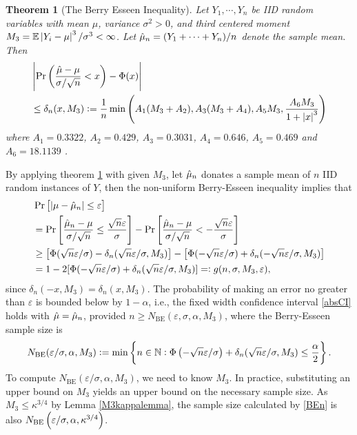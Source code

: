\documentclass{iitthesis}
\newtheorem{theorem}{Theorem}[section]
\theoremstyle{definition}
\begin{document}
\begin{theorem}[The Berry Esseen Inequality] \label{BEThm}
Let $Y_1,\cdots,Y_n$ be IID random variables with mean $\mu$, variance $\sigma^2 >0$, and third centered moment $M_3 = \mathbb{E}\left \lvert Y_i-\mu \right \rvert^3/\sigma^3 < \infty$. Let $\hat{\mu}_n = (Y_1+\cdots+Y_n)/n$ denote the sample mean. Then
\begin{align}
&\left \lvert \Pr\left(\frac{\hat{\mu}-\mu}{\sigma/\sqrt{n}}<x\right)-\Phi(x) \right \rvert\\
& \leq \delta_n(x,M_3):=\frac{1}{n}\min\left( A_1(M_3+A_2),  A_3(M_3+A_4), A_5M_3, \frac{A_6M_3}{1+\left \lvert x \right \rvert^3}\right) \label{deltaBEconstant}
\end{align}
where $A_1 = 0.3322$, $A_2 = 0.429$, $A_3=0.3031$, $A_4=0.646$, $A_5=0.469$ \cite{She13} and $A_6=18.1139$ \cite{NeShe12}.
\end{theorem}
By applying theorem \ref{BEThm} with given $M_3$, let $\hat{\mu}_n$ donates a sample mean of $n$ IID random instances of $Y$, then the non-uniform Berry-Esseen inequality implies that
\begin{align} 
&\Pr\left[\left \lvert \mu-\hat{\mu}_n \right \rvert  \le \varepsilon \right]\nonumber\\
&=\Pr\left[\frac{\hat{\mu}_n - \mu}{\sigma/\sqrt{n}} \le \frac{\sqrt{n}\varepsilon}{\sigma} \right]-\Pr\left[\frac{\hat{\mu}_n - \mu}{\sigma/\sqrt{n}} < -\frac{\sqrt{n}\varepsilon}{\sigma}\right] \nonumber \\ 
&\ge \left[\Phi(\sqrt{n}\varepsilon/\sigma)-\delta_n(\sqrt{n}\varepsilon/\sigma,M_3)\right] -\left[\Phi(-\sqrt{n}\varepsilon/\sigma) + \delta_n(-\sqrt{n}\varepsilon/\sigma,M_3)\right] \nonumber \\
&=1-2[\Phi(-\sqrt{n}\varepsilon/\sigma) + \delta_n(\sqrt{n}\varepsilon/\sigma,M_3)] =: g(n, \sigma, M_3, \varepsilon), \label{BEresult}
\end{align}
since $\delta_n(-x,M_3)=\delta_n(x,M_3)$.  The probability of
making an error no greater than $\varepsilon$ is bounded below by $1-\alpha$, i.e., the fixed width confidence interval \eqref{absCI} holds with $\hat{\mu}=\hat{\mu}_n$, provided $n \ge N_{\text{BE}}(\varepsilon,\sigma,\alpha,M_3)$, where the Berry-Esseen sample size is
\begin{equation}\label{BEn}
N_{\text{BE}}(\varepsilon/\sigma,\alpha,M_3) := \min  \left \{ n \in \mathbb{N} : \Phi\left(-\sqrt{n}\varepsilon/\sigma  \right)+\delta_n(\sqrt{n}\varepsilon/\sigma,M_3)
\le \frac{\alpha}{2} \right \}.
\end{equation}
To compute $N_{\text{BE}}(\varepsilon/\sigma,\alpha,M_3)$, we need to know
$M_3$. In practice, substituting an upper bound on $M_3$ yields an upper bound on the necessary sample size.
As $M_3 \leq \kappa^{3/4}$ by Lemma \ref{M3kappalemma}, the sample size calculated by \eqref{BEn} is also $N_{\text{BE}}\left(\varepsilon/\sigma,\alpha,\kappa^{3/4}\right) $.
\end{document}
